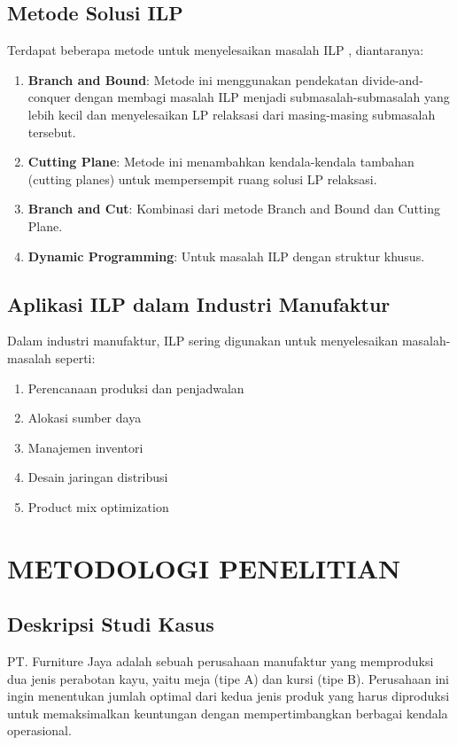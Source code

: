 \documentclass[twocolumn]{article}
\begin{document}
\subsection{Metode Solusi ILP}
Terdapat beberapa metode untuk menyelesaikan masalah ILP \cite{wolsey2020integer}, diantaranya:
\begin{enumerate}
    \item \textbf{Branch and Bound}: Metode ini menggunakan pendekatan divide-and-conquer dengan membagi masalah ILP menjadi submasalah-submasalah yang lebih kecil dan menyelesaikan LP relaksasi dari masing-masing submasalah tersebut.
    \item \textbf{Cutting Plane}: Metode ini menambahkan kendala-kendala tambahan (cutting planes) untuk mempersempit ruang solusi LP relaksasi.
    \item \textbf{Branch and Cut}: Kombinasi dari metode Branch and Bound dan Cutting Plane.
    \item \textbf{Dynamic Programming}: Untuk masalah ILP dengan struktur khusus.
\end{enumerate}

\subsection{Aplikasi ILP dalam Industri Manufaktur}
Dalam industri manufaktur, ILP sering digunakan untuk menyelesaikan masalah-masalah seperti:
\begin{enumerate}
    \item Perencanaan produksi dan penjadwalan
    \item Alokasi sumber daya
    \item Manajemen inventori
    \item Desain jaringan distribusi
    \item Product mix optimization
\end{enumerate}

\section{METODOLOGI PENELITIAN}
\subsection{Deskripsi Studi Kasus}
PT. Furniture Jaya adalah sebuah perusahaan manufaktur yang memproduksi dua jenis perabotan kayu, yaitu meja (tipe A) dan kursi (tipe B). Perusahaan ini ingin menentukan jumlah optimal dari kedua jenis produk yang harus diproduksi untuk memaksimalkan keuntungan dengan mempertimbangkan berbagai kendala operasional.
\end{document}
